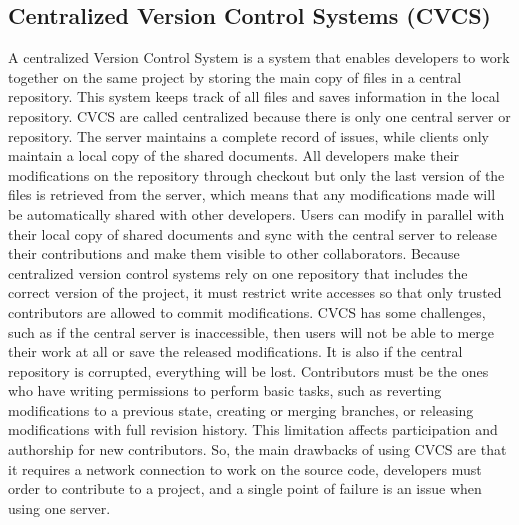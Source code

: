 \subsection{Centralized Version Control Systems (CVCS)}
A centralized Version Control System is a system that enables developers to work together on the same project by storing the main copy of files in a central repository. This system keeps track of all files and saves information in the local repository. CVCS are called centralized because there is only one central server or repository. The server maintains a complete record of issues, while clients only maintain a local copy of the shared documents. All developers make their modifications on the repository through checkout but only the last version of the files is retrieved from the server, which means that any modifications made will be automatically shared with other developers. Users can modify in parallel with their local copy of shared documents and sync with the central server to release their contributions and make them visible to other collaborators. Because centralized version control systems rely on one repository that includes the correct version of the project, it must restrict write accesses so that only trusted contributors are allowed to commit modifications. CVCS has some challenges, such as if the central server is inaccessible, then users will not be able to merge their work at all or save the released modifications. It is also if the central repository is corrupted, everything will be lost. Contributors must be the ones who have writing permissions to perform basic tasks, such as reverting modifications to a previous state, creating or merging branches, or releasing modifications with full revision history. This limitation affects participation and authorship for new contributors. So, the main drawbacks of using CVCS are that it requires a network connection to work on the source code, developers must order to contribute to a project, and a single point of failure is an issue when using one server.

